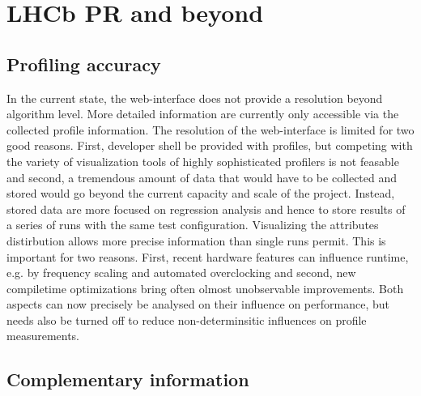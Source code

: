 \documentclass[a4paper]{jpconf}
\begin{document}
\section{LHCb PR and beyond}
\label{sec:lhcbpr_and_beyond}

\subsection{Profiling accuracy}
\label{sec:profiling accuracy}

In the current state, the web-interface does not provide a resolution beyond algorithm level. More detailed information are currently only accessible via the collected profile information. The resolution of the web-interface is limited for two good reasons. First, developer shell be provided with profiles, but competing with the variety of visualization tools of highly sophisticated profilers is not feasable and second, a tremendous amount of data that would have to be collected and stored would go beyond the current capacity and scale of the project.
\newline
Instead, stored data are more focused on regression analysis and hence to store results of a series of runs with the same test configuration. Visualizing the attributes distirbution allows more precise information than single runs permit. This is important for two reasons. First, recent hardware features can influence runtime, e.g. by frequency scaling and automated overclocking and second, new compiletime optimizations bring often olmost unobservable improvements. Both aspects can now precisely be analysed on their influence on performance, but needs also be turned off to reduce non-determinsitic influences on profile measurements.

\subsection{Complementary information}
\label{sec:complementary_information}
\end{document}
